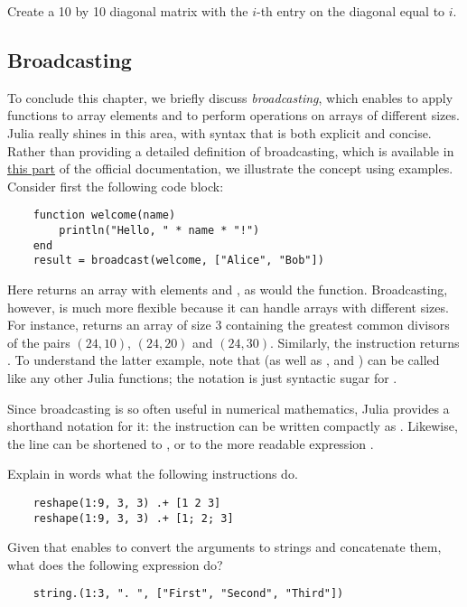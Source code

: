 \begin{task}
    Create a 10 by 10 diagonal matrix with the $i$-th entry on the diagonal equal to $i$.
\end{task}

\subsection*{Broadcasting}%
\label{sub:broadcasting}
To conclude this chapter,
we briefly discuss \emph{broadcasting},
which enables to apply functions to array elements and to perform operations on arrays of different sizes.
Julia really shines in this area,
with syntax that is both explicit and concise.
Rather than providing a detailed definition of broadcasting,
which is available in \href{https://docs.julialang.org/en/v1/manual/arrays/#Broadcasting}{this part} of the official documentation,
we illustrate the concept using examples.
Consider first the following code block:
\begin{verbatim}
    function welcome(name)
        println("Hello, " * name * "!")
    end
    result = broadcast(welcome, ["Alice", "Bob"])
\end{verbatim}
Here  returns an array with elements  and ,
as would the  function.
Broadcasting, however, is much more flexible because it can handle arrays with different sizes.
For instance,  returns an array of size 3 containing the greatest common divisors of the pairs $(24, 10)$, $(24, 20)$ and $(24, 30)$.
Similarly, the instruction  returns \julia{[2, 3, 4]}.
To understand the latter example, note that \julia{+} (as well as \julia{*}, \julia{-} and \julia{/}) can be called like any other Julia functions;
the notation  is just syntactic sugar for .

Since broadcasting is so often useful in numerical mathematics,
Julia provides a shorthand notation for it: the instruction 
can be written compactly as .
Likewise, the line  can be shortened to ,
or to the more readable expression .

\begin{task}
    Explain in words what the following instructions do.
    \begin{verbatim}
    reshape(1:9, 3, 3) .+ [1 2 3]
    reshape(1:9, 3, 3) .+ [1; 2; 3]
    \end{verbatim}
\end{task}

\begin{task}
    Given that  enables to convert the arguments to strings and concatenate them,
    what does the following expression do?
    \begin{verbatim}
    string.(1:3, ". ", ["First", "Second", "Third"])
    \end{verbatim}
\end{task}
